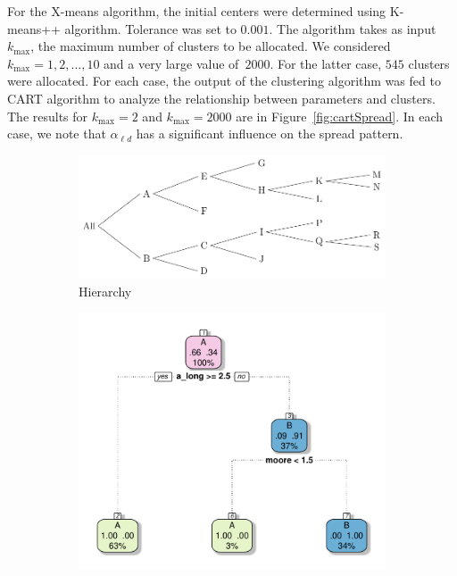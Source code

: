 \documentclass[10pt]{article}
\newcommand{\ald}{\alpha_{\ell d}}
\newcommand{\kmax}{k_{\max}}
\theoremstyle{definition}
\begin{document}
For the X-means algorithm, the initial centers were determined using
K-means++ algorithm. Tolerance was set to $0.001$. The algorithm takes as
input $\kmax$, the maximum number of clusters to be allocated. We
considered~$\kmax=1,2,\ldots,10$ and a very large value of~$2000$. For the
latter case, $545$ clusters were allocated. For each case, the output of
the clustering algorithm was fed to CART algorithm to analyze the
relationship between parameters and clusters. The results for $\kmax=2$
and $\kmax=2000$ are in Figure~\ref{fig:cartSpread}. In each case, we note
that $\ald$ has a significant influence on the spread pattern.
\begin{figure}[ht]
\centering
\begin{subfigure}[b]{.8\textwidth}
\includegraphics[width=\textwidth]{../clustering/results/agglomerative/hierarchy_agglomerative.pdf}
\caption{Hierarchy}
\end{subfigure}
\begin{subfigure}[b]{.32\textwidth}
\includegraphics[width=\textwidth]{../clustering/results/agglomerative/cart_cAB_agg.pdf}

\end{subfigure}
\end{figure}
\end{document}
